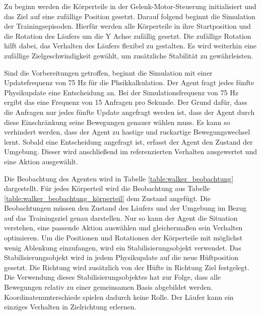 Zu beginn werden die Körperteile in der Gelenk-Motor-Steuerung initialisiert und das Ziel auf eine zufällige Position gesetzt.
Darauf folgend beginnt die Simulation der Trainingsepisoden. Hierfür werden alle Körperteile in ihre Startposition und die Rotation des Läufers um die Y Achse zufällig gesetzt. Die zufällige Rotation hilft dabei, das Verhalten des Läufers flexibel zu gestalten. Es wird weiterhin eine zufällige Zielgeschwindigkeit gewählt, um zusätzliche Stabilität zu gewährleisten.

Sind die Vorbereitungen getroffen, beginnt die Simulation mit einer Updatefrequenz von 75 Hz für die Phsikkalkulation. Der Agent fragt jedes fünfte Physikupdate eine Entscheidung an. Bei der Simulationsfrequenz von 75 Hz ergibt das eine Frequenz von 15 Anfragen pro Sekunde. Der Grund dafür, dass die Anfragen nur jedes fünfte Update angefragt werden ist, dass der Agent durch diese Einschränkung seine Bewegungen genauer wählen muss. Es kann so verhindert werden, dass der Agent zu hastige und ruckartige Bewegungswechsel lernt. Sobald eine Entscheidung angefragt ist, erfasst der Agent den Zustand der Umgebung. Dieser wird anschließend im referenzierten Verhalten ausgewertet und eine Aktion ausgewählt.

Die Beobachtung des Agenten wird in Tabelle \ref{table:walker_beobachtung} dargestellt. Für jedes Körperteil wird die Beobachtung aus Tabelle \ref{table:walker_beobachtung_körperteil} dem Zustand angefügt. Die Beobachtungen müssen den Zustand des Läufers und der Umgebung im Bezug auf das Trainingsziel genau darstellen. Nur so kann der Agent die Situation verstehen, eine passende Aktion auswählen und gleichermaßen sein Verhalten optimieren. Um die Positionen und Rotationen der Körperteile mit möglichst wenig Ablenkung einzufangen, wird ein Stabilisierungsobjekt verwendet. Das Stabilisierungsobjekt wird in jedem Physikupdate auf die neue Hüftposition gesetzt. Die Richtung wird zusätzlich von der Hüfte in Richtung Ziel festgelegt. Die Verwendung dieses Stabilisierungsobjektes hat zur Folge, dass alle Bewegungen relativ zu einer gemeinsamen Basis abgebildet werden. Koordinatenunterschiede spielen dadurch keine Rolle. Der Läufer kann ein einziges Verhalten in Zielrichtung erlernen.

